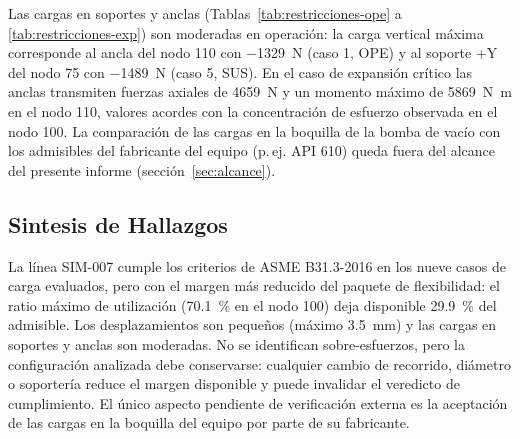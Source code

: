 Las cargas en soportes y anclas (Tablas~\ref{tab:restricciones-ope} a
\ref{tab:restricciones-exp}) son moderadas en operaci\'{o}n: la carga vertical
m\'{a}xima corresponde al ancla del nodo 110 con \num{-1329}~\si{N} (caso 1,
OPE) y al soporte +Y del nodo 75 con \num{-1489}~\si{N} (caso 5, SUS). En el
caso de expansi\'{o}n cr\'{i}tico las anclas transmiten fuerzas axiales de
\num{4659}~\si{N} y un momento m\'{a}ximo de \num{5869}~\si{N.m} en el nodo
110, valores acordes con la concentraci\'{o}n de esfuerzo observada en el nodo
100. La comparaci\'{o}n de las cargas en la boquilla de la bomba de vac\'{i}o
con los admisibles del fabricante del equipo (p.\,ej. API 610) queda fuera del
alcance del presente informe (secci\'{o}n~\ref{sec:alcance}).

\subsection{Sintesis de Hallazgos}

La l\'{i}nea SIM-007 cumple los criterios de ASME B31.3-2016 en los nueve casos
de carga evaluados, pero con el margen m\'{a}s reducido del paquete de
flexibilidad: el ratio m\'{a}ximo de utilizaci\'{o}n (70.1~\% en el nodo 100)
deja disponible 29.9~\% del admisible. Los desplazamientos son
peque\~{n}os (m\'{a}ximo 3.5~\si{mm}) y las cargas en soportes y anclas son
moderadas. No se identifican sobre-esfuerzos, pero la configuraci\'{o}n
analizada debe conservarse: cualquier cambio de recorrido,
di\'{a}metro o soporter\'{i}a reduce el margen disponible y puede invalidar el
veredicto de cumplimiento. El \'{u}nico aspecto pendiente de verificaci\'{o}n
externa es la aceptaci\'{o}n de las cargas en la boquilla del equipo por parte
de su fabricante.
